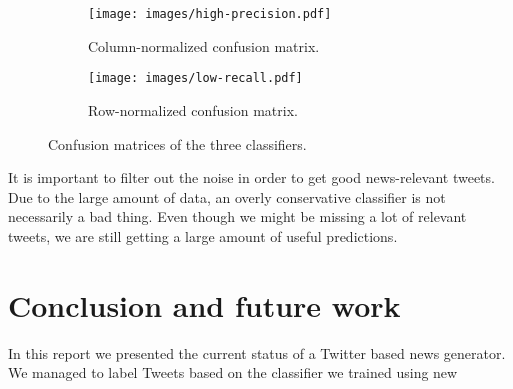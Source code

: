 \documentclass{llncs}
\begin{document}
\begin{figure}[H]
    \centering
    \begin{subfigure}[b]{0.48\textwidth}
        \texttt{[image: images/high-precision.pdf]}
        \caption{Column-normalized confusion matrix.}
        \label{fig:column-confusion-matrix}
    \end{subfigure}
    \begin{subfigure}[b]{0.48\textwidth}
        \texttt{[image: images/low-recall.pdf]}
        \caption{Row-normalized confusion matrix.}
        \label{fig:row-confusion-matrix}
    \end{subfigure}
    \caption{Confusion matrices of the three classifiers.}
    \label{fig:confusion-matrix}
 \end{figure}
 
It is important to filter out the noise in order to get good news-relevant tweets. Due to the large amount of data, an overly conservative classifier is not necessarily a bad thing. Even though we might be missing a lot of relevant tweets, we are still getting a large amount of useful predictions.

\section{Conclusion and future work}
In this report we presented the current status of a Twitter based news generator. We managed to label Tweets based on the classifier we trained using new 



\end{document}
